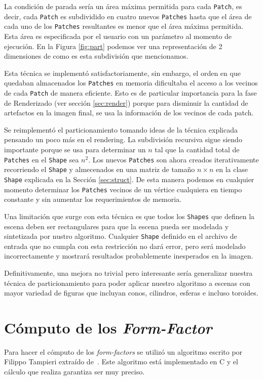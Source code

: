\documentclass[letterpaper]{article}
\begin{document}
La condición de parada sería un área máxima permitida para cada
\texttt{Patch}, es decir, cada \texttt{Patch} es subdividido en cuatro
nuevos \texttt{Patches} hasta que el área de cada uno de los
\texttt{Patches} resultantes es menor que el área máxima
permitida. Esta área es especificada por el usuario con un parámetro
al momento de ejecución. En la Figura \ref{fig:part} podemos ver una
representación de 2 dimensiones de como es esta subdivisión que
mencionamos.

Esta técnica se implementó satisfactoriamente, sin embargo, el orden
en que quedaban almacenados los \texttt{Patches} en memoria
dificultaba el acceso a los vecinos de cada \texttt{Patch} de manera
eficiente. Esto es de particular importancia para la fase de
Renderizado (ver sección \ref{sec:render}) porque para disminuir la
cantidad de artefactos en la imagen final, se usa la información de
los vecinos de cada patch.

Se reimplementó el particionamiento tomando ideas de la técnica
explicada pensando un poco más en el rendering. La subdivisión
recursiva sigue siendo importante porque se usa para determinar un $n$
tal que la cantidad total de \texttt{Patches} en el \texttt{Shape} sea
$n^2$. Los nuevos \texttt{Patches} son ahora creados iterativamente
recorriendo el \texttt{Shape} y almecenados en una matriz de tamaño
$n \times n$ en la clase \texttt{Shape} explicada en la Sección
\ref{sec:struct}. De esta manera podemos en cualquier momento
determinar los \texttt{Patches} vecinos de un vértice cualquiera en
tiempo constante y sin aumentar los requerimientos de memoria.

Una limitación que surge con esta técnica es que todos los
\texttt{Shapes} que definen la escena deben ser rectangulares para que
la escena pueda ser modelada y sintetizada por nustro
algoritmo. Cualquier \texttt{Shape} definido en el archivo de entrada
que no cumpla con esta restricción no dará error, pero será modelado
incorrectamente y mostrará resultados probablemente inesperados en la
imagen.

Definitivamente, una mejora no trivial pero interesante sería
generalizar nuestra técnica de particionamiento para poder aplicar
nuestro algoritmo a escenas con mayor variedad de figuras que incluyan
conos, cilindros, esferas e incluso toroides.

\section{Cómputo de los \textsl{Form-Factor}}
\label{sec:ff}
Para hacer el cómputo de los \textsl{form-factors} se utilizó un
algoritmo escrito por Filippo Tampieri extraído de~\cite{ggems3}. Este
algoritmo está implementado en C y el cálculo que realiza garantiza
ser muy preciso.
\end{document}
